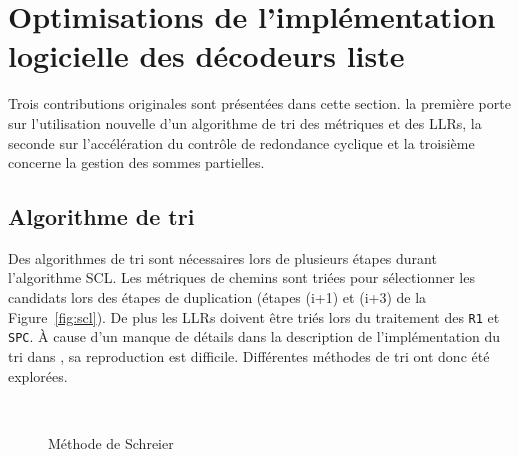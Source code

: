 \section{Optimisations de l'implémentation logicielle des décodeurs liste}
\label{sec:opti_scl}
Trois contributions originales sont présentées dans cette section. la première porte sur l'utilisation nouvelle d'un algorithme de tri des métriques et des LLRs, la seconde sur l'accélération du contrôle de redondance cyclique et la troisième concerne la gestion des sommes partielles. 

\subsection{Algorithme de tri}
Des algorithmes de tri sont nécessaires lors de plusieurs étapes durant l'algorithme SCL. Les métriques de chemins sont triées pour sélectionner les candidats lors des étapes de duplication (étapes (i+1) et (i+3) de la Figure~\ref{fig:scl}). De plus les LLRs doivent être triés lors du traitement des \noeuds \texttt{R1} et \texttt{SPC}. \`A cause d'un manque de détails dans la description de l'implémentation du tri dans \cite{sarkis_fast_2016}, sa reproduction est difficile. Différentes méthodes de tri ont donc été explorées.
\begin{figure}[t]
\centering
{}
\\
\caption{Méthode de Schreier}
\label{fig:schreier_sort}
\end{figure}

